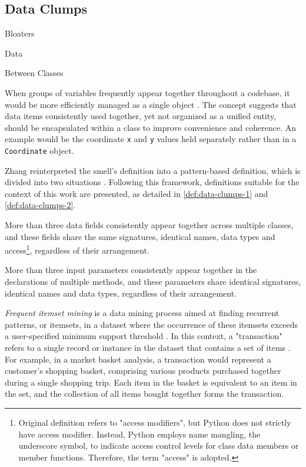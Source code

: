 \subsection{Data Clumps}

\begin{description}[align=left, labelwidth=2.4cm]
  \item [Obstruction] Bloaters
  \item [Occurence] Data
  \item [Expanse] Between Classes 
\end{description}


When groups of variables frequently appear together throughout a codebase, it would be more efficiently managed as a single object \cite{Martin_2018}. The concept suggests that data items consistently used together, yet not organized as a unified entity, should be encapsulated within a class to improve convenience and coherence. An example would be the coordinate \texttt{x} and \texttt{y} values held separately rather than in a \texttt{Coordinate} object.


Zhang \etal reinterpreted the smell's definition into a pattern-based definition, which is divided into two situations \cite{Zhang_2008}. Following this framework, definitions suitable for the context of this work are presented, as detailed in \autoref{def:data-clumps-1} and \ref{def:data-clumps-2}.

\begin{definition}
More than three data fields consistently appear together across multiple classes, and these fields share the same signatures, \ie identical names, data types and access\footnote{Original definition refers to "access modifiers", but Python does not strictly have access modifier. Instead, Python employs name mangling, \ie the underscore symbol, to indicate access control levels for class data members or member functions. Therefore, the term "access" is adopted.}, regardless of their arrangement.
\label{def:data-clumps-1}
\end{definition}


\begin{definition}
More than three input parameters consistently appear together in the declarations of multiple methods, and these parameters share identical signatures, \ie identical names and data types, regardless of their arrangement.
\label{def:data-clumps-2}
\end{definition}


\textit{Frequent itemset mining} is a data mining process aimed at finding recurrent patterns, or itemsets, in a dataset where the occurrence of these itemsets exceeds a user-specified minimum support threshold \cite{Agrawal_1996}. In this context, a "transaction" refers to a single record or instance in the dataset that contains a set of items \cite{Toivonen_2010}. For example, in a market basket analysis, a transaction would represent a customer's shopping basket, comprising various products purchased together during a single shopping trip. Each item in the basket is equivalent to an item in the set, and the collection of all items bought together forms the transaction. 

